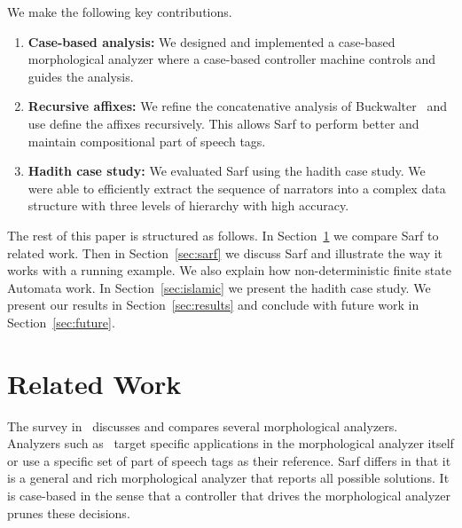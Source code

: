 \documentclass[11pt]{article}
\begin{document}
We make the following key contributions. 
\begin{enumerate}
\item {\bf Case-based analysis:}  We designed and implemented
a case-based morphological analyzer where a case-based controller
machine controls and guides the analysis. 
\item {\bf Recursive affixes:}
We refine the concatenative analysis of 
Buckwalter~  and use define the affixes
recursively. 
This allows Sarf to perform better and 
maintain compositional part of speech tags.
\item {\bf Hadith case study:}
We evaluated Sarf using the hadith case study. We were able to
efficiently extract the sequence of narrators into a complex
data structure with three levels of hierarchy with high accuracy. 
\end{enumerate}


The rest of this paper is structured as follows. In Section~\ref{sec:related}
we compare Sarf to related work. Then in Section~\ref{sec:sarf}
we discuss Sarf and illustrate the way it works with a running example.
We also explain how non-deterministic finite state Automata
work. In Section~\ref{sec:islamic} we present the hadith case
study. We present our results in Section~\ref{sec:results}
and conclude with future work in Section~\ref{sec:future}.


\section{Related Work }
\label{sec:related}

The survey in~\cite{Sughaiyer:04} discusses and compares
several morphological analyzers. 
Analyzers such as~\cite{Khoja:01,Darwish:02} 
target specific applications in the morphological 
analyzer itself or use a specific set of part of speech tags
as their reference.
Sarf differs in that it is a general and rich morphological 
analyzer that reports all possible solutions. 
It is case-based in the sense that a controller that drives
the morphological analyzer prunes these decisions. 
\end{document}
